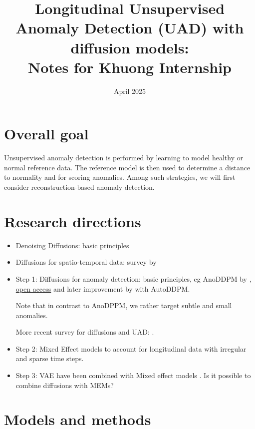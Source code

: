 \documentclass{article}
\title{Longitudinal Unsupervised Anomaly Detection (UAD) with diffusion models:\\
Notes for Khuong Internship}
\author{ }
\date{April 2025}
\begin{document}
\maketitle

\section{Overall goal}

 Unsupervised anomaly detection is performed by learning to model healthy or normal reference data. The reference model is then  used to determine a distance to normality and  for scoring anomalies. Among such strategies, we will first consider reconstruction-based anomaly detection. 

 
\section{Research directions}

\begin{itemize}
\item Denoising Diffusions: basic principles
\item Diffusions for spatio-temporal data: survey by \cite{Yang2024}
\item Step 1: Diffusions for anomaly detection: basic principles, eg AnoDDPM by \cite{Wyatt2022}, \href{https://openaccess.thecvf.com/content/CVPR2022W/NTIRE/html/Wyatt_AnoDDPM_Anomaly_Detection_With_Denoising_Diffusion_Probabilistic_Models_Using_Simplex_CVPRW_2022_paper.html}{open access} and later improvement by \cite{Bercea2023} with AutoDDPM. 

Note that in contrast to AnoDPPM, we rather target subtle and small anomalies. 

More recent survey for diffusions and UAD: \cite{}. 

\item Step 2: Mixed Effect models to account for longitudinal data with irregular and sparse time steps.

\item Step 3: VAE have been combined with Mixed effect models \cite{Sauty2022}. Is it possible to combine diffusions with MEMs? 

\end{itemize}

\section{Models and methods}
\end{document}
